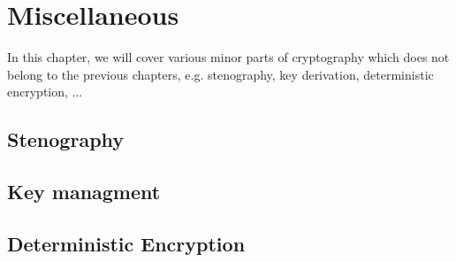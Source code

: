 \chapter{Miscellaneous}

In this chapter, we will cover various minor parts of cryptography which does not belong to the previous chapters, e.g. stenography, key derivation, deterministic encryption, ...

\section{Stenography}

\section{Key managment}

\section{Deterministic Encryption}